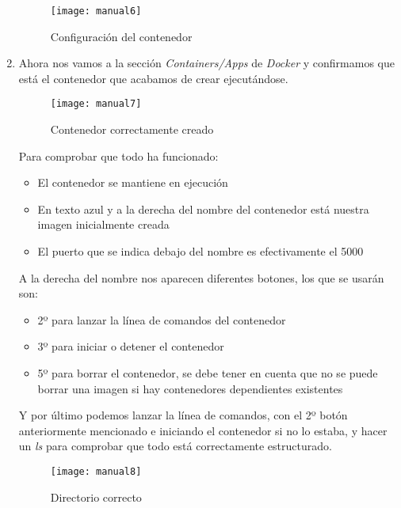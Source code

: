 \begin{enumerate}
    \begin{figure}[htb]
	\centering
	\texttt{[image: manual6]}
	\caption[Configuración del contenedor]{Configuración del contenedor}
    \end{figure}
    
    \item Ahora nos vamos a la sección \emph{Containers/Apps} de \emph{Docker} y confirmamos que está el contenedor que acabamos de crear ejecutándose.
    
    \begin{figure}[htb]
	\centering
	\texttt{[image: manual7]}
	\caption[Contenedor correctamente creado]{Contenedor correctamente creado}
    \end{figure}
    
    \clearpage
    
    Para comprobar que todo ha funcionado:
    
    \begin{itemize}
        \item El contenedor se mantiene en ejecución
        \item En texto azul y a la derecha del nombre del contenedor está nuestra imagen inicialmente creada
        \item El puerto que se indica debajo del nombre es efectivamente el 5000
    \end{itemize}
    
    A la derecha del nombre nos aparecen diferentes botones, los que se usarán son:
    
    \begin{itemize}
        \item 2º para lanzar la línea de comandos del contenedor
        \item 3º para iniciar o detener el contenedor
        \item 5º para borrar el contenedor, se debe tener en cuenta que no se puede borrar una imagen si hay contenedores dependientes existentes
    \end{itemize}  
    
    Y por último podemos lanzar la línea de comandos, con el 2º botón anteriormente mencionado e iniciando el contenedor si no lo estaba, y hacer un \emph{ls} para comprobar que todo está correctamente estructurado.
    
    \begin{figure}[htb]
	\centering
	\texttt{[image: manual8]}
	\caption[Directorio correcto]{Directorio correcto}
    \end{figure}
    

\end{enumerate}

